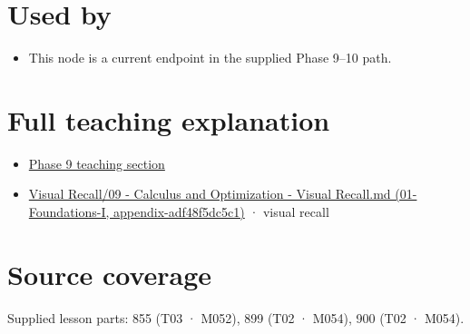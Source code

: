 \section{Used by}\label{appendix-8836553d56fc-used-by}

\begin{itemize}
\tightlist
\item
  This node is a current endpoint in the supplied Phase 9--10 path.
\end{itemize}

\section{Full teaching explanation}\label{appendix-8836553d56fc-full-teaching-explanation}

\begin{itemize}
\tightlist
\item
  \href{Continuous\%20Notes/Computing\%20Foundations\%20-\%20From\%20Bits\%20to\%20C++\%20and\%20Systems\%20APIs\#Numerical\%20differentiation\%20and\%20automatic\%20differentiation}{Phase 9 teaching section}
\item
  \href{../01-Foundations-I/main.pdf\#nameddest=appendix-adf48f5dc5c1}{Visual Recall/09 - Calculus and Optimization - Visual Recall.md (01-Foundations-I, appendix-adf48f5dc5c1)} · visual recall
\end{itemize}

\section{Source coverage}\label{appendix-8836553d56fc-source-coverage}

Supplied lesson parts: 855 (T03 · M052), 899 (T02 · M054), 900 (T02 · M054).
